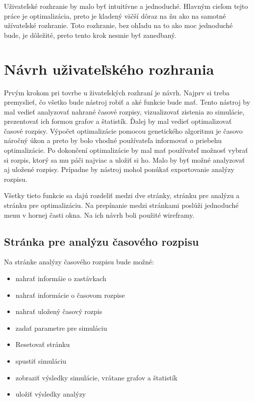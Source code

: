 Uživateľské rozhranie by malo byť intuitívne a jednoduché.
Hlavným cieľom tejto práce je optimalizácia, preto je kladený väčší dôraz na ňu ako na samotné užívateľské rozhranie.
Toto rozhranie, bez ohľadu na to ako moc jednoduché bude, je dôležité, preto tento krok nesmie byť zanedbaný.

\section{Návrh uživateľského rozhrania}\label{nastroj_uzivatelske_rozhranie}

Prvým krokom pri tovrbe u živateľských rozhraní je návrh.
Najprv si treba premyslieť, čo všetko bude nástroj robiť a aké funkcie bude mať.
Tento nástroj by mal vedieť analyzovať nahrané časové rozpisy, vizualizovať zistenia zo simulácie, prezentovať ich formou grafov a štatistík.
Ďalej by mal vedieť optimalizovať časové rozpisy. Výpočet optimalizácie pomocou genetického algoritmu je časovo náročný úkon a preto by bolo vhodné používateľa informovať o priebehu optimalizácie.
Po dokončení optimalizácie by mal mať používateľ možnosť vybrať si rozpis, ktorý sa mu páči najviac a uložiť si ho.
Malo by byť možné analyzovať aj uložené rozpisy.
Prípadne by nástroj mohol ponúkať exportovanie analýzy rozpisu.

Všetky tieto funkcie sa dajú rozdeliť medzi dve stránky, stránku pre analýzu a stránku pre optimalizáciu.
Na prepínanie medzi stránkami poslúži jednoduché menu v hornej časti okna.
Na ich návrh boli použité wireframy.

\newpage
\subsection*{Stránka pre analýzu časového rozpisu}
Na stránke analýzy časového rozpisu bude možné:
\begin{itemize}
  \item nahrať informáie o zastávkach
  \item nahrať informácie o časovom rozpise
  \item nahrať uložený časový rozpis
  \item zadať parametre pre simuláciu
  \item Resetovať stránku
  \item spustiť simuláciu
  \item zobraziť výsledky simulácie, vrátane grafov a štatistík
  \item uložiť výsledky analýzy
\end{itemize}

